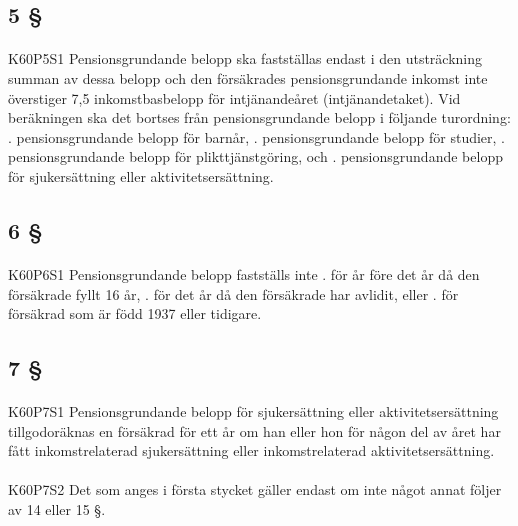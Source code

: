 \documentclass[a4paper,notitlepage,openany,10pt]{book}
\begin{document}
\subsection*{5 §}
\paragraph*{}
{\tiny K60P5S1}
Pensionsgrundande belopp ska fastställas endast i den utsträckning summan av dessa belopp och den försäkrades pensionsgrundande inkomst inte överstiger 7,5 inkomstbasbelopp för intjänandeåret (intjänandetaket). Vid beräkningen ska det bortses från pensionsgrundande belopp i följande turordning:
. pensionsgrundande belopp för barnår,
. pensionsgrundande belopp för studier,
. pensionsgrundande belopp för plikttjänstgöring, och
. pensionsgrundande belopp för sjukersättning eller aktivitetsersättning.
\subsection*{6 §}
\paragraph*{}
{\tiny K60P6S1}
Pensionsgrundande belopp fastställs inte
. för år före det år då den försäkrade fyllt 16 år,
. för det år då den försäkrade har avlidit, eller
. för försäkrad som är född 1937 eller tidigare.
\subsection*{7 §}
\paragraph*{}
{\tiny K60P7S1}
Pensionsgrundande belopp för sjukersättning eller aktivitetsersättning tillgodoräknas en försäkrad för ett år om han eller hon för någon del av året har fått inkomstrelaterad sjukersättning eller inkomstrelaterad aktivitetsersättning.
\paragraph*{}
{\tiny K60P7S2}
Det som anges i första stycket gäller endast om inte något annat följer av 14 eller 15 §.
\end{document}
